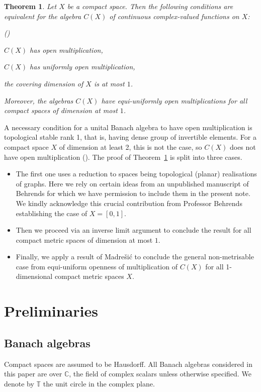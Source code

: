 \documentclass[12pt,fleqn]{amsart}
\newcounter{maintheorem}
\newtheorem{mainth}[maintheorem]{Theorem}
\theoremstyle{definition}
\numberwithin{equation}{section}
\theoremstyle{remark}
\newcounter{smallromans}
\newenvironment{romanenumerate}
{\begin{list}{{\normalfont\textrm{(\roman{smallromans})}}}%
  {\usecounter{smallromans}\setlength{\itemindent}{0cm}%
   \setlength{\leftmargin}{5.5ex}\setlength{\labelwidth}{5.5ex}%
   \setlength{\topsep}{.5ex}\setlength{\partopsep}{.5ex}%
   \setlength{\itemsep}{0.1ex}}}%
{\end{list}}
\begin{document}
\begin{mainth}\label{thm:c}
    Let $X$ be a compact space. Then the following conditions are equivalent for the algebra $C(X)$ of continuous complex-valued functions on $X$:
    \begin{romanenumerate}
        \item $C(X)$ has open multiplication,
        \item $C(X)$ has uniformly open multiplication,
        \item the covering dimension of $X$ is at most $1$.
    \end{romanenumerate}
    Moreover, the algebras $C(X)$ have equi-uniformly open multiplications for all compact spaces of dimension at most $1$.
\end{mainth}
A necessary condition for a unital Banach algebra to have open multiplication is topological stable rank 1, that is, having dense group of invertible elements. For a compact space $X$ of dimension at least 2, this is not the case, so $C(X)$ does not have open multiplication (\cite[Proposition 4.4]{DraKa}). The proof of Theorem~\ref{thm:c} is split into three cases.
%
\begin{itemize}
    \item The first one uses a reduction to spaces being topological (planar) realisations of graphs. Here we rely on certain ideas from an unpublished manuscript of Behrends for which we have permission to include them in the present note. We kindly acknowledge this crucial contribution from Professor Behrends establishing the case of $X=[0,1]$. 
    \item Then we proceed via an inverse limit argument to conclude the result for all compact metric spaces of dimension at most $1$. 
    \item Finally, we apply a result of Madre\v{s}i\'c \cite{mardevsic1960covering} to conclude the general non-metrisable case from equi-uniform openness of multiplication of $C(X)$ for all 1-dimensional compact metric spaces $X$.
\end{itemize}

\section{Preliminaries}
\subsection{Banach algebras}

Compact spaces are assumed to be Hausdorff. All Banach algebras considered in this paper are over $\mathbb C$, the field of complex scalars unless otherwise specified. We denote by $\mathbb T$ the unit circle in the complex plane.\smallskip
\end{document}
